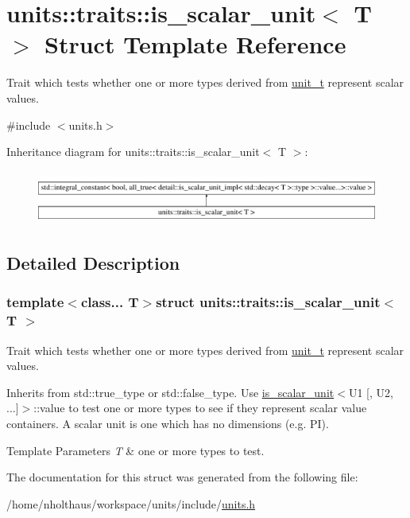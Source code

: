 \hypertarget{structunits_1_1traits_1_1is__scalar__unit}{}\section{units\+:\+:traits\+:\+:is\+\_\+scalar\+\_\+unit$<$ T $>$ Struct Template Reference}
\label{structunits_1_1traits_1_1is__scalar__unit}


Trait which tests whether one or more types derived from {\ttfamily \hyperlink{classunits_1_1unit__t}{unit\+\_\+t}} represent scalar values.  




{\ttfamily \#include $<$units.\+h$>$}

Inheritance diagram for units\+:\+:traits\+:\+:is\+\_\+scalar\+\_\+unit$<$ T $>$\+:\begin{figure}[H]
\begin{center}
\leavevmode
\includegraphics[height=1.786284cm]{structunits_1_1traits_1_1is__scalar__unit}
\end{center}
\end{figure}


\subsection{Detailed Description}
\subsubsection*{template$<$class... T$>$struct units\+::traits\+::is\+\_\+scalar\+\_\+unit$<$ T $>$}

Trait which tests whether one or more types derived from {\ttfamily \hyperlink{classunits_1_1unit__t}{unit\+\_\+t}} represent scalar values. 

Inherits from {\ttfamily std\+::true\+\_\+type} or {\ttfamily std\+::false\+\_\+type}. Use {\ttfamily \hyperlink{structunits_1_1traits_1_1is__scalar__unit}{is\+\_\+scalar\+\_\+unit}$<$U1 \mbox{[}, U2, ...\mbox{]}$>$\+::value} to test one or more types to see if they represent scalar value containers. A scalar unit is one which has no dimensions (e.\+g. P\+I). 
\begin{DoxyTemplParams}{Template Parameters}
{\em T} & one or more types to test. \\
\hline
\end{DoxyTemplParams}


The documentation for this struct was generated from the following file\+:\begin{DoxyCompactItemize}
\item 
/home/nholthaus/workspace/units/include/\hyperlink{units_8h}{units.\+h}\end{DoxyCompactItemize}

